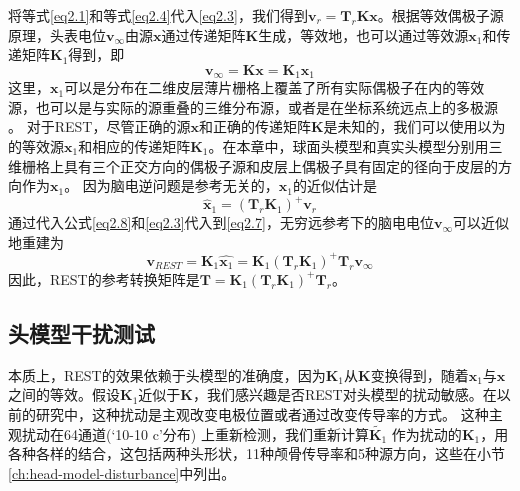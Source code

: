 将等式\eqref{eq2.1}和等式\eqref{eq2.4}代入\eqref{eq2.3}，我们得到$\mathbf{v}_r=\mathbf{T}_{r}\mathbf{Kx}$。根据等效偶极子源原理，头表电位$\mathbf{v}_{\infty}$由源$\mathbf{x}$通过传递矩阵$\mathbf{K}$生成，等效地，也可以通过等效源$\mathbf{x}_1$和传递矩阵$\mathbf{K}_1$得到，即
\begin{equation}\label{eq2.7}
\mathbf{v}_{\infty}=\mathbf{Kx}=\mathbf{K}_1\mathbf{x}_1
\end{equation}
这里，$\mathbf{x}_1$可以是分布在二维皮层薄片栅格上覆盖了所有实际偶极子在内的等效源，也可以是与实际的源重叠的三维分布源，或者是在坐标系统远点上的多极源 。 对于REST，尽管正确的源$\mathbf{x}$和正确的传递矩阵$\mathbf{K}$是未知的，我们可以使用以为的等效源$\mathbf{x}_1$和相应的传递矩阵$\mathbf{K}_1$。在本章中，球面头模型和真实头模型分别用三维栅格上具有三个正交方向的偶极子源和皮层上偶极子具有固定的径向于皮层的方向作为$\mathbf{x}_1$。 因为脑电逆问题是参考无关的，$\mathbf{x}_1$的近似估计是
\begin{equation}\label{eq2.8}
\hat{\mathbf{x}}_1=(\mathbf{T}_r\mathbf{K}_1)^+\mathbf{v}_r
\end{equation}
通过代入公式\eqref{eq2.8}和\eqref{eq2.3}代入到\eqref{eq2.7}，无穷远参考下的脑电电位$\mathbf{v}_{\infty}$可以近似地重建为
\begin{equation}\label{eq2.9}
\mathbf{v}_{REST}=\mathbf{K}_1\hat{\mathbf{x}_1}=\mathbf{K}_1(\mathbf{T}_r\mathbf{K}_1)^+\mathbf{T}_r\mathbf{v}_\infty
\end{equation}
因此，REST的参考转换矩阵是$\mathbf{T}=\mathbf{K}_1(\mathbf{T}_r\mathbf{K}_1)^+\mathbf{T}_r$。
\subsection{头模型干扰测试}
本质上，REST的效果依赖于头模型的准确度，因为$\mathbf{K}_1$从$\mathbf{K}$变换得到，随着$\mathbf{x}_1$与$\mathbf{x}$之间的等效。假设$\mathbf{K}_1$近似于$\mathbf{K}$，我们感兴趣是否REST对头模型的扰动敏感。在以前的研究中，这种扰动是主观改变电极位置或者通过改变传导率的方式。 这种主观扰动在64通道(‘10-10 c’分布) 上重新检测，我们重新计算$\tilde{\mathbf{K}_1}$ 作为扰动的$\mathbf{K}_1$，用各种各样的结合，这包括两种头形状，11种颅骨传导率和5种源方向，这些在小节\ref{ch:head-model-disturbance}中列出。

